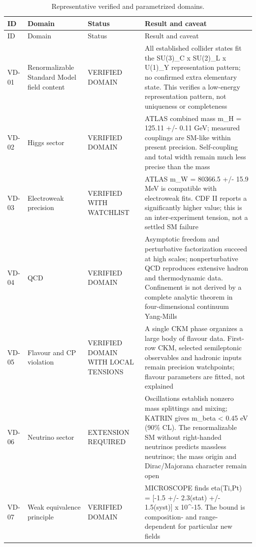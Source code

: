 \begingroup\small
\setlength\LTleft{0pt}\setlength\LTright{0pt}
\begin{longtable}{@{}p{0.75cm}p{2.35cm}p{2.55cm}p{7.35cm}@{}}
\caption{Representative verified and parametrized domains.}\label{tab:verified}\\
\toprule ID & Domain & Status & Result and caveat\\\midrule\endfirsthead
\toprule ID & Domain & Status & Result and caveat\\\midrule\endhead
VD-01 & Renormalizable Standard Model field content & VERIFIED DOMAIN & All established collider states fit the SU(3)\_C x SU(2)\_L x U(1)\_Y representation pattern; no confirmed extra elementary state. This verifies a low-energy representation pattern, not uniqueness or completeness \\
VD-02 & Higgs sector & VERIFIED DOMAIN & ATLAS combined mass m\_H = 125.11 +/- 0.11 GeV; measured couplings are SM-like within present precision. Self-coupling and total width remain much less precise than the mass \\
VD-03 & Electroweak precision & VERIFIED WITH WATCHLIST & ATLAS m\_W = 80366.5 +/- 15.9 MeV is compatible with electroweak fits. CDF II reports a significantly higher value; this is an inter-experiment tension, not a settled SM failure \\
VD-04 & QCD & VERIFIED DOMAIN & Asymptotic freedom and perturbative factorization succeed at high scales; nonperturbative QCD reproduces extensive hadron and thermodynamic data. Confinement is not derived by a complete analytic theorem in four-dimensional continuum Yang-Mills \\
VD-05 & Flavour and CP violation & VERIFIED DOMAIN WITH LOCAL TENSIONS & A single CKM phase organizes a large body of flavour data. First-row CKM, selected semileptonic observables and hadronic inputs remain precision watchpoints; flavour parameters are fitted, not explained \\
VD-06 & Neutrino sector & EXTENSION REQUIRED & Oscillations establish nonzero mass splittings and mixing; KATRIN gives m\_beta < 0.45 eV (90\% CL). The renormalizable SM without right-handed neutrinos predicts massless neutrinos; the mass origin and Dirac/Majorana character remain open \\
VD-07 & Weak equivalence principle & VERIFIED DOMAIN & MICROSCOPE finds eta(Ti,Pt) = [-1.5 +/- 2.3(stat) +/- 1.5(syst)] x 10\textasciicircum{}-15. The bound is composition- and range-dependent for particular new fields \\

\end{longtable}
